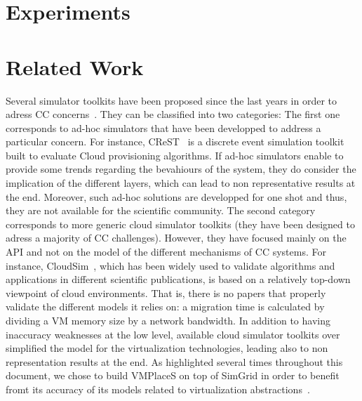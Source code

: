 \documentclass[conference]{IEEEtran}
\newcommand{\sg}{SimGrid\xspace}
\newcommand{\vmps}{VMPlaceS\xspace}
\begin{document}
\section{Experiments}
\label{sec:experiments}
\section{Related Work}
\label{sec:related}

Several simulator toolkits have been proposed since the last years in
order to adress CC concerns~\cite{CC13, DGSIM, cloudsim,
  icancloud, greencloud}.
They can be classified into two categories: The first one corresponds to ad-hoc simulators
that have been developped to address a particular concern. For
instance, CReST~\cite{CC13} is a discrete event simulation toolkit
built to evaluate Cloud provisioning algorithms. If ad-hoc simulators
enable to provide some trends regarding the bevahiours of the system,
they do consider the implication of the different layers, which can
lead to non representative results at the end. Moreover, such ad-hoc
solutions are developped for one shot and thus, they are not available
for the scientific community. The second category
\cite{icancloud, greencloud, cloudsim} corresponds to more generic cloud simulator
toolkits (\ie they have been designed to adress a majority
of CC challenges). However, they have focused mainly on
the API and not on the model of the different mechanisms of CC
systems.
For instance, CloudSim~\cite{cloudsim}, which has been widely used to validate
algorithms and applications in different scientific publications,
is based on a relatively top-down viewpoint of cloud environments.
That is,  there is no papers that properly validate the different models it
relies on: a migration time is calculated by dividing a VM memory size by a
network bandwidth.
 In addition to having inaccuracy weaknesses at the low level, available cloud
simulator toolkits over simplified the model for the virtualization
technologies, leading also to non representation results at the
end. As highlighted several times throughout this document, we chose to
build \vmps on top of \sg in order to benefit fromt its accuracy of
its models related to virtualization abstractions~\cite{Hirofuchi:2013:ALM:2568486.2568524}.
\end{document}
